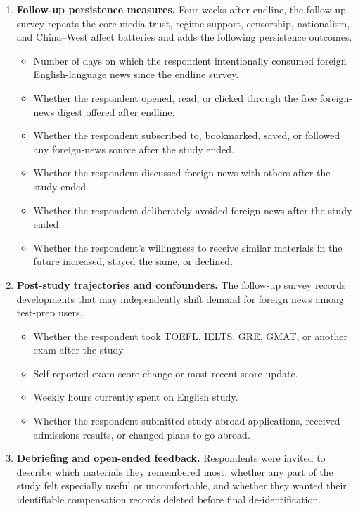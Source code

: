 \documentclass[12pt,american]{article}
\begin{document}
\begin{enumerate}[label=\arabic*., leftmargin=1.5em]
\begin{itemize}
\item The foreign-news materials improved my vocabulary for exams or study abroad.
\item I would use similar materials again even if they were not politically relevant.
\end{itemize}
\item \textbf{Follow-up persistence measures.} Four weeks after endline, the follow-up survey repeats the core media-trust, regime-support, censorship, nationalism, and China--West affect batteries and adds the following persistence outcomes.
\begin{itemize}
\item Number of days on which the respondent intentionally consumed foreign English-language news since the endline survey.
\item Whether the respondent opened, read, or clicked through the free foreign-news digest offered after endline.
\item Whether the respondent subscribed to, bookmarked, saved, or followed any foreign-news source after the study ended.
\item Whether the respondent discussed foreign news with others after the study ended.
\item Whether the respondent deliberately avoided foreign news after the study ended.
\item Whether the respondent's willingness to receive similar materials in the future increased, stayed the same, or declined.
\end{itemize}
\item \textbf{Post-study trajectories and confounders.} The follow-up survey records developments that may independently shift demand for foreign news among test-prep users.
\begin{itemize}
\item Whether the respondent took TOEFL, IELTS, GRE, GMAT, or another exam after the study.
\item Self-reported exam-score change or most recent score update.
\item Weekly hours currently spent on English study.
\item Whether the respondent submitted study-abroad applications, received admissions results, or changed plans to go abroad.
\end{itemize}
\item \textbf{Debriefing and open-ended feedback.} Respondents were invited to describe which materials they remembered most, whether any part of the study felt especially useful or uncomfortable, and whether they wanted their identifiable compensation records deleted before final de-identification.
\end{enumerate}
\end{document}
